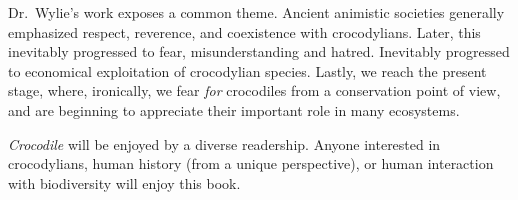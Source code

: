 \documentclass[letterpaper,12pt]{article}
\newcommand{\croc}{\emph{Crocodile}\xspace}
\begin{document}
Dr.\ Wylie's work exposes a common theme. Ancient animistic societies generally
emphasized respect, reverence, and coexistence with crocodylians.
Later, this inevitably progressed to fear, misunderstanding and hatred.
Inevitably progressed to economical exploitation of crocodylian species.
Lastly, we reach the present stage, where, ironically, we fear \emph{for}
crocodiles from a conservation point of view, and are beginning to appreciate
their important role in many ecosystems.

\croc will be enjoyed by a diverse readership. Anyone interested in
crocodylians, human history (from a unique perspective), or human interaction
with biodiversity will enjoy this book.




\end{document}
